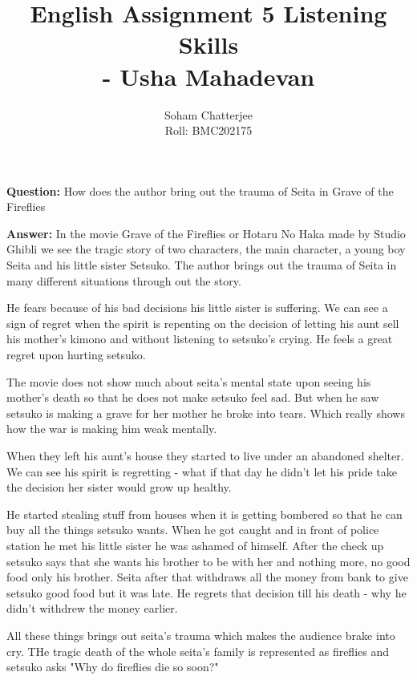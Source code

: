 \documentclass{article}
\title{\huge{English Assignment 5 Listening Skills\\\hspace{7cm}- Usha Mahadevan}
}
\author{Soham Chatterjee\\Roll: BMC202175}
\date{}
\begin{document}
	\maketitle\pagebreak
	\textbf{Question:} How does the author bring out the trauma of Seita in Grave of the Fireflies 
	
	
	\textbf{Answer:} In the movie Grave of the Fireflies or Hotaru No Haka made by Studio Ghibli we see the tragic story of two characters, the main character, a young boy Seita and his little sister Setsuko. The author brings out the trauma of Seita in many different situations through out the story.
	
	He fears because of his bad decisions his little sister is suffering. We can see a sign of regret when the spirit is repenting on the decision of letting his aunt sell his mother's kimono and without listening to setsuko's crying. He feels a great regret upon hurting setsuko. 
	
	The movie does not show much about seita's mental state upon seeing his mother's death so that he does not make setsuko feel sad. But when he saw setsuko is making a grave for her mother he broke into tears. Which really shows how the war is making him weak mentally. 
	
	When they left his aunt's house they started to live under an abandoned shelter. We can see his spirit is regretting - what if that day he didn't let his pride take the decision her sister would grow up healthy.  
	
	He started stealing stuff from houses when it is getting bombered so that he can buy all the things setsuko wants. When he got caught and in front of police station he met his little sister he was ashamed of himself. After the check up setsuko says that she wants his brother to be with her and nothing more, no good food only his brother. Seita after that withdraws all the money from bank to give setsuko good food but it was late. He regrets that decision till his death - why he didn't withdrew the money earlier. 
	
	All these things brings out seita's trauma which makes the audience brake into cry. THe tragic death of the whole seita's family is represented as fireflies and setsuko asks "Why do fireflies die so soon?"
	
	
\end{document}

